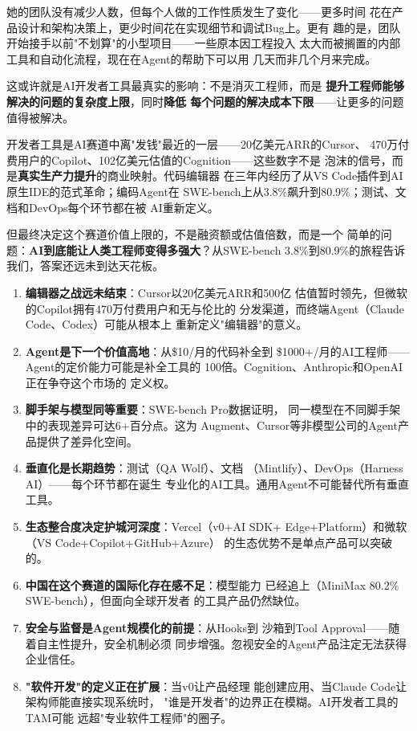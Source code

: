 她的团队没有减少人数，但每个人做的工作性质发生了变化——更多时间
花在产品设计和架构决策上，更少时间花在实现细节和调试Bug上。更有
趣的是，团队开始接手以前"不划算"的小型项目——一些原本因工程投入
太大而被搁置的内部工具和自动化流程，现在在Agent的帮助下可以用
几天而非几个月来完成。

这或许就是AI开发者工具最真实的影响：不是消灭工程师，而是
\textbf{提升工程师能够解决的问题的复杂度上限}，同时\textbf{降低
每个问题的解决成本下限}——让更多的问题值得被解决。

开发者工具是AI赛道中离"发钱"最近的一层——20亿美元ARR的Cursor、
470万付费用户的Copilot、102亿美元估值的Cognition——这些数字不是
泡沫的信号，而是\textbf{真实生产力提升}的商业映射。代码编辑器
在三年内经历了从VS Code插件到AI原生IDE的范式革命；编码Agent在
SWE-bench上从3.8\%飙升到80.9\%；测试、文档和DevOps每个环节都在被
AI重新定义。

但最终决定这个赛道价值上限的，不是融资额或估值倍数，而是一个
简单的问题：\textbf{AI到底能让人类工程师变得多强大}？从SWE-bench
3.8\%到80.9\%的旅程告诉我们，答案还远未到达天花板。

\begin{whybox}[本章核心洞察总结]
\begin{enumerate}
  \item \textbf{编辑器之战远未结束}：Cursor以20亿美元ARR和500亿
    估值暂时领先，但微软的Copilot拥有470万付费用户和无与伦比的
    分发渠道，而终端Agent（Claude Code、Codex）可能从根本上
    重新定义"编辑器"的意义。
  \item \textbf{Agent是下一个价值高地}：从\$10/月的代码补全到
    \$1000+/月的AI工程师——Agent的定价能力可能是补全工具的
    100倍。Cognition、Anthropic和OpenAI正在争夺这个市场的
    定义权。
  \item \textbf{脚手架与模型同等重要}：SWE-bench Pro数据证明，
    同一模型在不同脚手架中的表现差异可达6+百分点。这为
    Augment、Cursor等非模型公司的Agent产品提供了差异化空间。
  \item \textbf{垂直化是长期趋势}：测试（QA Wolf）、文档
    （Mintlify）、DevOps（Harness AI）——每个环节都在诞生
    专业化的AI工具。通用Agent不可能替代所有垂直工具。
  \item \textbf{生态整合度决定护城河深度}：Vercel（v0+AI SDK+
    Edge+Platform）和微软（VS Code+Copilot+GitHub+Azure）
    的生态优势不是单点产品可以突破的。
  \item \textbf{中国在这个赛道的国际化存在感不足}：模型能力
    已经追上（MiniMax 80.2\% SWE-bench），但面向全球开发者
    的工具产品仍然缺位。
  \item \textbf{安全与监督是Agent规模化的前提}：从Hooks到
    沙箱到Tool Approval——随着自主性提升，安全机制必须
    同步增强。忽视安全的Agent产品注定无法获得企业信任。
  \item \textbf{"软件开发"的定义正在扩展}：当v0让产品经理
    能创建应用、当Claude Code让架构师能直接实现系统时，
    "谁是开发者"的边界正在模糊。AI开发者工具的TAM可能
    远超"专业软件工程师"的圈子。
\end{enumerate}
\end{whybox}

